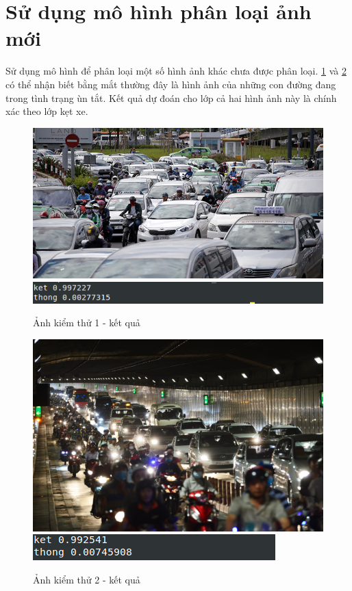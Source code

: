 \section{Sử dụng mô hình phân loại ảnh mới}
	Sử dụng mô hình để phân loại một số hình ảnh khác chưa được phân loại. \ref{fig:test1} và \ref{fig:test2} có thể nhận biết bằng mắt thường đây là hình ảnh của những con đường đang trong tình trạng ùn tắt. Kết quả dự đoán cho lớp cả hai hình ảnh này là chính xác theo lớp kẹt xe.
	
	\begin{figure}[h!]
		\centering
		\includegraphics[scale=0.5]{charts/test.jpg}
		\includegraphics[scale=0.5]{charts/res_test.png}
		\caption{Ảnh kiểm thử 1 - kết quả}
		\label{fig:test1}
	\end{figure}
	
	\begin{figure}[h!]
		\centering
		\includegraphics[scale=0.2]{charts/test2.JPG}
		\includegraphics[scale=0.5]{charts/res_test2.png}
		\caption{Ảnh kiểm thử 2 - kết quả}
		\label{fig:test2}
	\end{figure}
	\pagebreak
	
